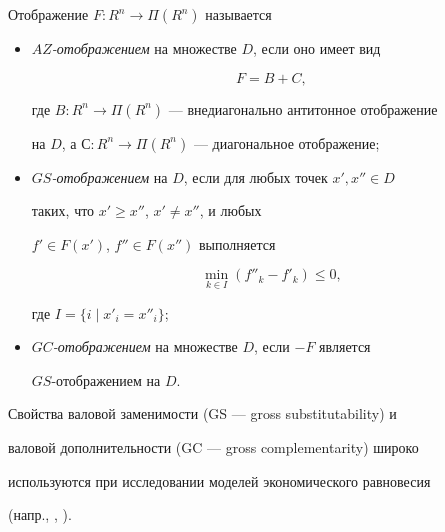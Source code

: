 \begin{defns} \label{def:3}


Отображение $F: R^n \to \Pi (R^n)$ называется


\begin{itemize}


\item[а)] {\it $AZ$-отображением} на множестве $D$, если оно имеет вид


\begin{equation}\label{eq:5}


F=B+C,


\end{equation}


где $B: R^n \to \Pi (R^n)$ --- внедиагонально антитонное отображение


на $D$, а $С: R^n \to \Pi (R^n)$ --- диагональное отображение;


\item[b)] {\it $GS$-отображением} на $D$, если для любых точек $x',x'' \in D$


таких, что $x'\ge x''$, $x' \neq x''$, и любых


$f' \in F(x')$, $f'' \in F(x'')$ выполняется


$$


\min\limits_{k \in I} (f''_k-f'_k) \le 0,


$$


где $I=\{i\mid x'_i=x''_i \}$;


\item[с)] {\it $GC$-отображением} на множестве $D$, если $-F$ является


$GS$-отображением на $D$.


\end{itemize}


\end{defns}








Свойства валовой заменимости (GS --- gross substitutability) и


валовой дополнительности (GC --- gross complementarity) широко


используются при исследовании моделей экономического равновесия


(напр., \cite{How80}, \cite{PS82}).











